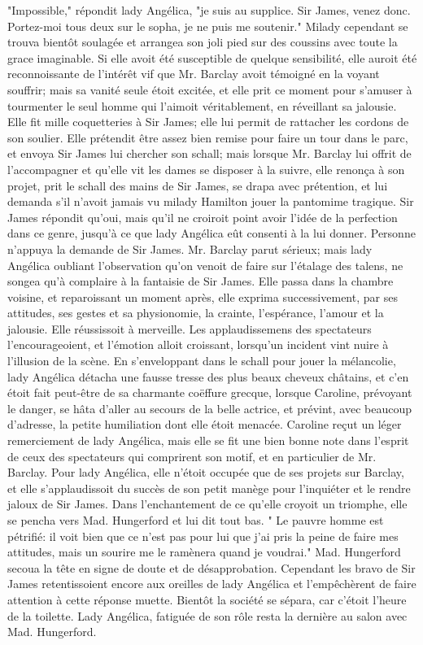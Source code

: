 "Impossible," répondit lady Angélica, "je suis au supplice. Sir James, venez donc. Portez-moi tous deux sur le sopha, je ne puis me soutenir." Milady cependant se trouva bientôt soulagée et arrangea son joli pied sur des coussins avec toute la grace imaginable. Si elle avoit été susceptible de quelque sensibilité, elle auroit été reconnoissante de l’intérêt vif que Mr. Barclay avoit témoigné en la voyant souffrir; mais sa vanité seule étoit excitée, et elle prit ce moment pour s’amuser à tourmenter le seul homme qui l’aimoit véritablement, en réveillant sa jalousie. Elle fit mille coquetteries à Sir James; elle lui permit de rattacher les cordons de son soulier. Elle prétendit être assez bien remise pour faire un tour dans le parc, et envoya Sir James lui chercher son schall; mais lorsque Mr. Barclay lui offrit de l’accompagner et qu’elle vit les dames se disposer à la suivre, elle renonça à son projet, prit le schall des\setcounter{page}{535} mains de Sir James, se drapa avec prétention, et lui demanda s'il n'avoit jamais vu milady Hamilton jouer la pantomime tragique. Sir James répondit qu'oui, mais qu'il ne croiroit point avoir l'idée de la perfection dans ce genre, jusqu'à ce que lady Angélica eût consenti à la lui donner.
Personne n'appuya la demande de Sir James. Mr. Barclay parut sérieux; mais lady Angélica oubliant l'observation qu'on venoit de faire sur l'étalage des talens, ne songea qu'à complaire à la fantaisie de Sir James. Elle passa dans la chambre voisine, et reparoissant un moment après, elle exprima successivement, par ses attitudes, ses gestes et sa physionomie, la crainte, l'espérance, l'amour et la jalousie. Elle réussissoit à merveille. Les applaudissemens des spectateurs l'encourageoient, et l'émotion alloit croissant, lorsqu'un incident vint nuire à l'illusion de la scène. En s'enveloppant dans le schall pour jouer la mélancolie, lady Angélica détacha une fausse tresse des plus beaux cheveux châtains, et c'en étoit fait peut-être de sa charmante coëffure grecque, lorsque Caroline, prévoyant le danger, se hâta d'aller au secours de la belle actrice, et prévint, avec beaucoup d'adresse, la petite humiliation dont elle étoit menacée.\setcounter{page}{536} Caroline reçut un léger remerciement de lady Angélica, mais elle se fit une bien bonne note dans l’esprit de ceux des spectateurs qui comprirent son motif, et en particulier de Mr. Barclay.
Pour lady Angélica, elle n’étoit occupée que de ses projets sur Barclay, et elle s’applaudissoit du succès de son petit manège pour l’inquiéter et le rendre jaloux de Sir James. Dans l’enchantement de ce qu’elle croyoit un triomphe, elle se pencha vers Mad. Hungerford et lui dit tout bas. " Le pauvre homme est pétrifié: il voit bien que ce n’est pas pour lui que j’ai pris la peine de faire mes attitudes, mais un sourire me le ramènera quand je voudrai." Mad. Hungerford secoua la tête en signe de doute et de désapprobation. Cependant les bravo de Sir James retentissoient encore aux oreilles de lady Angélica et l’empêchèrent de faire attention à cette réponse muette. Bientôt la société se sépara, car c’étoit l’heure de la toilette. Lady Angélica, fatiguée de son rôle resta la dernière au salon avec Mad. Hungerford.
